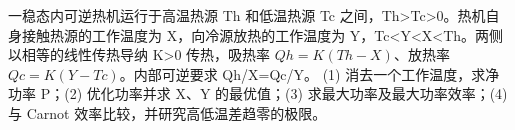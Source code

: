 一稳态内可逆热机运行于高温热源 Th 和低温热源 Tc 之间，Th>Tc>0。热机自身接触热源的工作温度为 X，向冷源放热的工作温度为 Y，Tc<Y<X<Th。两侧以相等的线性传热导纳 K>0 传热，吸热率 \(Qh=K(Th-X)\)、放热率 \(Qc=K(Y-Tc)\)。内部可逆要求 Qh/X=Qc/Y。
(1) 消去一个工作温度，求净功率 P；(2) 优化功率并求 X、Y 的最优值；(3) 求最大功率及最大功率效率；(4) 与 Carnot 效率比较，并研究高低温差趋零的极限。
